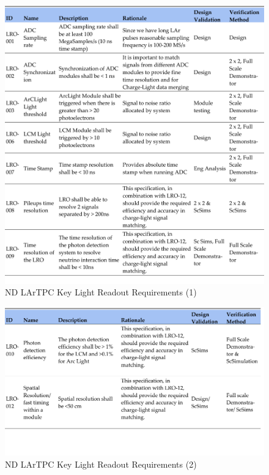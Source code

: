 \begin{figure}
\centering 
\includegraphics[width=1\linewidth]{graphics/lartpc/0Req/NDLROreqs1.pdf}
\caption{\label{fig:lartpclroreq1} ND LArTPC Key Light Readout Requirements (1)}
\end{figure}

\begin{figure}
\centering 
\includegraphics[width=1\linewidth]{graphics/lartpc/0Req/NDLROreqs2.pdf}
\caption{\label{fig:lartpclroreq2} ND LArTPC Key Light Readout Requirements (2)}
\end{figure}

